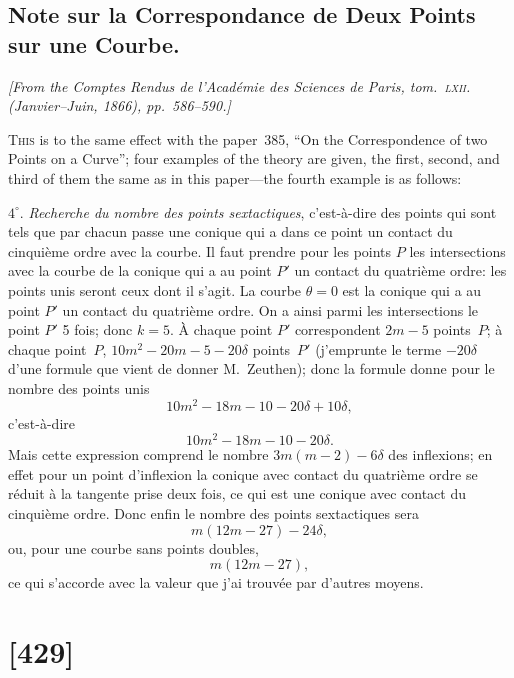 \documentclass[11pt,a4paper]{article}
\theoremstyle{plain}
\theoremstyle{definition}
\begin{document}
\subsection{Note sur la Correspondance de Deux Points sur une Courbe.}

\begin{center}
\textit{[From the Comptes Rendus de l'Acad\'emie des Sciences de Paris, tom.~\textsc{lxii}.
(Janvier--Juin, 1866), pp.~586--590.]}
\end{center}

\textsc{This} is to the same effect with the paper~385, ``On the Correspondence of two Points on a Curve'';
four examples of the theory are given, the first, second, and third of them the same as in this paper---the
fourth example is as follows:

\medskip

$4^\circ$.  \textit{Recherche du nombre des points sextactiques}, c'est-\`a-dire des points qui sont tels
que par chacun passe une conique qui a dans ce point un contact du cinqui\`eme ordre
avec la courbe.  Il faut prendre pour les points $P$ les intersections avec la courbe de
la conique qui a au point $P'$ un contact du quatri\`eme ordre: les points unis seront
ceux dont il s'agit.  La courbe $\theta = 0$ est la conique qui a au point $P'$ un contact
du quatri\`eme ordre.  On a ainsi parmi les intersections le point $P'$ 5 fois; donc $k = 5$.
\`A chaque point $P'$ correspondent $2m - 5$ points~$P$; \`a chaque point~$P$, $10m^2 - 20m - 5 - 20\delta$
points~$P'$ (j'emprunte le terme $-20\delta$ d'une formule que vient de donner M.\ Zeuthen);
donc la formule donne pour le nombre des points unis
\[
10m^2 - 18m - 10 - 20\delta + 10\delta,
\]
c'est-\`a-dire
\[
10m^2 - 18m - 10 - 20\delta.
\]
Mais cette expression comprend le nombre $3m(m-2) - 6\delta$ des inflexions; en effet pour
un point d'inflexion la conique avec contact du quatri\`eme ordre se r\'eduit \`a la
tangente prise deux fois, ce qui est une conique avec contact du cinqui\`eme ordre.  Donc
enfin le nombre des points sextactiques sera
\[
m(12m - 27) - 24\delta,
\]
ou, pour une courbe sans points doubles,
\[
m(12m - 27),
\]
ce qui s'accorde avec la valeur que j'ai trouv\'ee par d'autres moyens.

\clearpage

\section{[429]}
\end{document}
